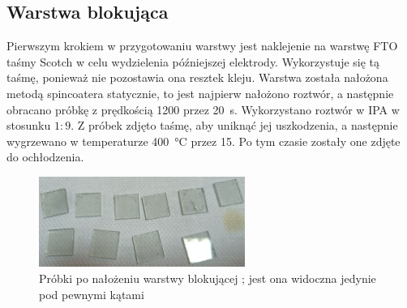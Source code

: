 \documentclass[12pt]{article}
\begin{document}
	\subsection{Warstwa blokująca }
	Pierwszym krokiem w przygotowaniu warstwy jest naklejenie na warstwę FTO taśmy Scotch w celu wydzielenia późniejszej elektrody. Wykorzystuje się tą taśmę, ponieważ nie pozostawia ona resztek kleju. Warstwa  została nałożona metodą spincoatera statycznie, to jest najpierw nałożono roztwór, a następnie obracano próbkę z prędkością \qty{1200}{\rpm} przez \qty{20}{\s}. Wykorzystano roztwór  w IPA w stosunku $1:9$. Z próbek zdjęto taśmę, aby uniknąć jej uszkodzenia, a następnie wygrzewano w temperaturze \qty{400}{\degreeCelsius} przez \qty{15}{\min}. Po tym czasie zostały one zdjęte do ochłodzenia. 
	\begin{figure}[H]
		\centering
		\includegraphics[width=0.6\textwidth]{probki_tio2_blok.png}
		\caption{Próbki po nałożeniu warstwy blokującej ; jest ona widoczna jedynie pod pewnymi kątami}
	\end{figure}
	
\end{document}
